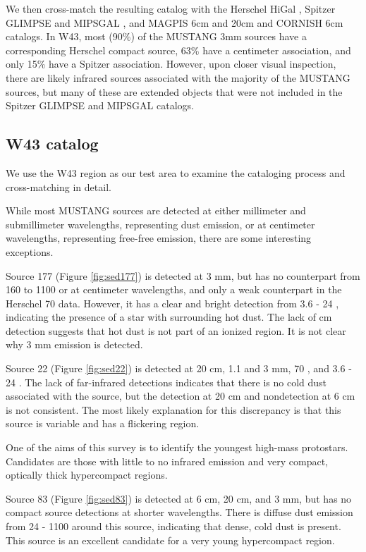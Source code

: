 \documentclass[twocolumn]{aastex62}
\begin{document}
We then cross-match the resulting catalog with the Herschel HiGal
\citep{Elia2017a}, Spitzer GLIMPSE and MIPSGAL \citep{Churchwell2009a,Gutermuth2015a}, and MAGPIS 6cm and 20cm
\citep{Giveon2005a,Hoare2006a} and CORNISH 6cm \citep{Hoare2012a} catalogs.  In
W43, most (90\%) of the MUSTANG 3mm sources have a corresponding Herschel
compact source, 63\% have a centimeter association, and only 15\% have a
Spitzer association.  However, upon closer visual inspection, there are likely
infrared sources associated with the majority of the MUSTANG sources, but
many of these are extended objects that were not included in the Spitzer GLIMPSE
and MIPSGAL catalogs.

\subsection{W43 catalog}
We use the W43 region as our test area to examine the cataloging process and
cross-matching in detail.

While most MUSTANG sources are detected at either millimeter and submillimeter
wavelengths, representing dust emission, or at centimeter wavelengths,
representing free-free emission, there are some interesting exceptions.

Source 177 (Figure \ref{fig:sed177}) is detected at 3 mm, but has no counterpart from 160 to 1100 \um or
at centimeter wavelengths, and only a weak counterpart in the Herschel 70 \um
data. However, it has a clear and bright detection from 3.6 - 24 \um, indicating
the presence of a star with surrounding hot dust.  The lack of cm detection suggests
that hot dust is not part of an ionized region.  It is not clear why 3 mm emission
is detected.

Source 22 (Figure \ref{fig:sed22}) is detected at 20 cm, 1.1 and 3 mm, 70 \um,
and 3.6 - 24 \um.  The lack of far-infrared detections indicates that there is
no cold dust associated with the source, but the detection at 20 cm and
nondetection at 6 cm is not consistent.  The most likely explanation for this
discrepancy is that this source is variable and has a flickering \hii region.

One of the aims of this survey is to identify the youngest high-mass protostars.
Candidates are those with little to no infrared emission and very compact, optically
thick hypercompact \hii regions.

Source 83 (Figure \ref{fig:sed83}) is detected at 6 cm, 20 cm, and 3 mm, but has no compact source detections
at shorter wavelengths.  There is diffuse dust emission from 24 - 1100 \um around this
source, indicating that dense, cold dust is present.  This source is an excellent
candidate for a very young hypercompact \hii region.
\end{document}
